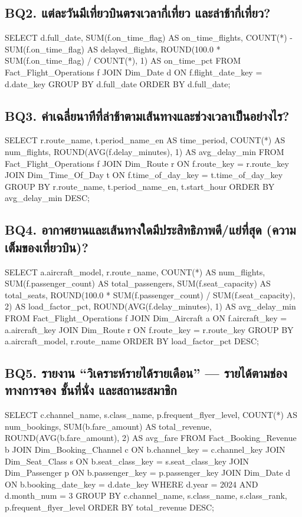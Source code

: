 \documentclass[11pt]{article}
\begin{document}
\subsection*{BQ2. แต่ละวันมีเที่ยวบินตรงเวลากี่เที่ยว และล่าช้ากี่เที่ยว?}
\begin{sql}
SELECT d.full_date,
       SUM(f.on_time_flag) AS on_time_flights,
       COUNT(*) - SUM(f.on_time_flag) AS delayed_flights,
       ROUND(100.0 * SUM(f.on_time_flag) / COUNT(*), 1) AS on_time_pct
FROM Fact_Flight_Operations f
JOIN Dim_Date d ON f.flight_date_key = d.date_key
GROUP BY d.full_date
ORDER BY d.full_date;
\end{sql}

\subsection*{BQ3. ค่าเฉลี่ยนาทีที่ล่าช้าตามเส้นทางและช่วงเวลาเป็นอย่างไร?}
\begin{sql}
SELECT r.route_name, t.period_name_en AS time_period,
       COUNT(*) AS num_flights,
       ROUND(AVG(f.delay_minutes), 1) AS avg_delay_min
FROM Fact_Flight_Operations f
JOIN Dim_Route r ON f.route_key = r.route_key
JOIN Dim_Time_Of_Day t ON f.time_of_day_key = t.time_of_day_key
GROUP BY r.route_name, t.period_name_en, t.start_hour
ORDER BY avg_delay_min DESC;
\end{sql}

\subsection*{BQ4. อากาศยานและเส้นทางใดมีประสิทธิภาพดี/แย่ที่สุด (ความเต็มของเที่ยวบิน)?}
\begin{sql}
SELECT a.aircraft_model, r.route_name,
       COUNT(*) AS num_flights,
       SUM(f.passenger_count) AS total_passengers,
       SUM(f.seat_capacity) AS total_seats,
       ROUND(100.0 * SUM(f.passenger_count) / SUM(f.seat_capacity), 2) AS load_factor_pct,
       ROUND(AVG(f.delay_minutes), 1) AS avg_delay_min
FROM Fact_Flight_Operations f
JOIN Dim_Aircraft a ON f.aircraft_key = a.aircraft_key
JOIN Dim_Route r ON f.route_key = r.route_key
GROUP BY a.aircraft_model, r.route_name
ORDER BY load_factor_pct DESC;
\end{sql}
\clearpage
\subsection*{BQ5. รายงาน ``วิเคราะห์รายได้รายเดือน'' — รายได้ตามช่องทางการจอง ชั้นที่นั่ง และสถานะสมาชิก}
\begin{sql}
SELECT c.channel_name, s.class_name, p.frequent_flyer_level,
       COUNT(*) AS num_bookings,
       SUM(b.fare_amount) AS total_revenue,
       ROUND(AVG(b.fare_amount), 2) AS avg_fare
FROM Fact_Booking_Revenue b
JOIN Dim_Booking_Channel c ON b.channel_key = c.channel_key
JOIN Dim_Seat_Class s ON b.seat_class_key = s.seat_class_key
JOIN Dim_Passenger p ON b.passenger_key = p.passenger_key
JOIN Dim_Date d ON b.booking_date_key = d.date_key
WHERE d.year = 2024 AND d.month_num = 3
GROUP BY c.channel_name, s.class_name, s.class_rank, p.frequent_flyer_level
ORDER BY total_revenue DESC;
\end{sql}
\end{document}
